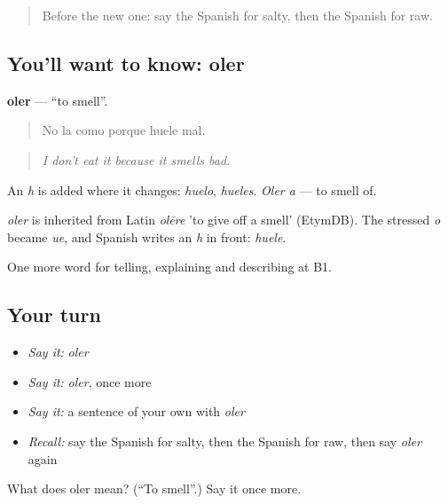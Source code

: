 \label{lesson:ES-C771-oler}



\begin{quote}
Before the new one: say the Spanish for salty, then the Spanish for raw.
\end{quote}

\subsection*{You'll want to know: oler}
\textbf{oler} — \textquotedblleft{}to smell\textquotedblright{}.

\begin{quote}
No la como porque huele mal.
\end{quote}

\begin{quote}
\emph{I don't eat it because it smells bad.}
\end{quote}

An \emph{h} is added where it changes: \emph{huelo}, \emph{hueles}. \emph{Oler a} — to smell of.

\begin{cousinweb}
\emph{oler} is inherited from Latin \emph{olēre} 'to give off a smell' (EtymDB). The stressed \emph{o} became \emph{ue}, and Spanish writes an \emph{h} in front: \emph{huele}.
\end{cousinweb}

\begin{grammarlens}[title={What you've built}]
One more word for telling, explaining and describing at B1.
\end{grammarlens}

\subsection*{Your turn}
\begin{itemize}
\raggedright
  \item \emph{Say it:} \emph{oler}
  \item \emph{Say it:} \emph{oler}, once more
  \item \emph{Say it:} a sentence of your own with \emph{oler}
  \item \emph{Recall:} say the Spanish for salty, then the Spanish for raw, then say \emph{oler} again
\end{itemize}

\begin{tcolorbox}[breakable,colback=teal!4,colframe=teal!35!black,title={Before you move on}]
What does oler mean? (\textquotedblleft{}To smell\textquotedblright{}.) Say it once more.
\end{tcolorbox}
